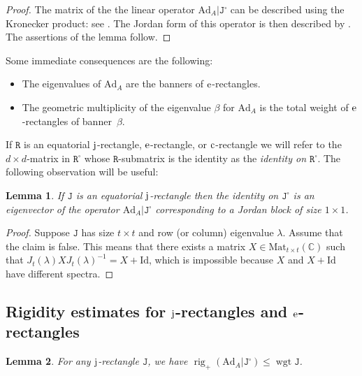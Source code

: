 \documentclass[10pt, a4paper]{amsart}
\theoremstyle{plain}
\newtheorem{lemma}{Lemma}[section]
\theoremstyle{definition}
\theoremstyle{remark}
\theoremstyle{note}
\numberwithin{equation}{section}
\begin{document}
\begin{proof}
The matrix of the the linear operator ${\mathrm{Ad}}_A | {\mathtt{J}}^\square$
can be described using the Kronecker product: see \cite[Lemma~4.3.1]{HJ}.
The Jordan form of this operator is then described by \cite[Theorem~4.3.17(a)]{HJ}.
The assertions of the lemma follow.
\end{proof}

Some immediate consequences are the following:
\begin{itemize}
\item The eigenvalues of ${\mathrm{Ad}}_A$ are the banners of $\rm e$-rectangles.
\item The geometric multiplicity of the eigenvalue $\beta$ for ${\mathrm{Ad}}_A$ is the total weight of $\rm e$-rectangles of banner~$\beta$.
\end{itemize}

\medskip

If ${\mathtt{R}}$ is an equatorial $\rm j$-rectangle, $\rm e$-rectangle, or $\rm c$-rectangle
we will refer to 
the $d\times d$-matrix in ${\mathtt{R}}^\square$ whose ${\mathtt{R}}$-submatrix is the identity
as the \emph{identity on ${\mathtt{R}}^\square$}.
The following observation will be useful:

\begin{lemma}\label{l.1x1}
If ${\mathtt{J}}$ is an equatorial $\rm j$-rectangle then the identity on ${\mathtt{J}}^\square$
is an eigenvector of the operator ${\mathrm{Ad}}_A | {\mathtt{J}}^\square$ corresponding to a Jordan block of size $1 \times 1$. 
\end{lemma}

\begin{proof}
Suppose ${\mathtt{J}}$ has size $t \times t$ and row (or column) eigenvalue $\lambda$.
Assume that the claim is false.
This means that there exists a matrix $X \in {\mathrm{Mat}}_{t \times t}({\mathbb{C}})$ such that $J_t(\lambda) X J_t(\lambda)^{-1} = X + {\mathrm{Id}}$, which is impossible because $X$ and $X + {\mathrm{Id}}$ have different spectra.
\end{proof}

\subsection{Rigidity estimates for $\rm j$-rectangles and $\rm e$-rectangles}

\begin{lemma}\label{l.rig district}
For any $\rm j$-rectangle ${\mathtt{J}}$, we have $\operatorname{rig}_+ ({\mathrm{Ad}}_A | {\mathtt{J}}^\square)  \le \operatorname{wgt} {\mathtt{J}}$.
\end{lemma}
\end{document}

